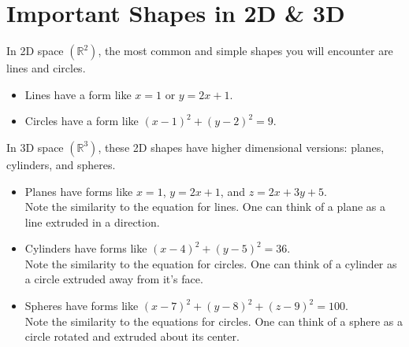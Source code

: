 \section{Important Shapes in 2D \& 3D}
\noindent
In 2D space $\left(\mathbb{R}^2\right)$, the most common and simple shapes you will encounter are lines and circles.
\begin{itemize}
	\item Lines have a form like $x=1$ or $y=2x+1$.
	\item Circles have a form like $\left(x-1\right)^2+\left(y-2\right)^2=9$.
\end{itemize}

\noindent
In 3D space $\left(\mathbb{R}^3\right)$, these 2D shapes have higher dimensional versions: planes, cylinders, and spheres.
\begin{itemize}
	\item{Planes have forms like $x=1$, $y=2x+1$, and $z=2x+3y+5$.\\
		\small{Note the similarity to the equation for lines. One can think of a plane as a line extruded in a direction.}}
	\item{Cylinders have forms like $\left(x-4\right)^2+\left(y-5\right)^2=36$.\\
		\small{Note the similarity to the equation for circles. One can think of a cylinder as a circle extruded away from it's face.}}
	\item{Spheres have forms like $\left(x-7\right)^2+\left(y-8\right)^2+\left(z-9\right)^2=100$.\\
		\small{Note the similarity to the equations for circles. One can think of a sphere as a circle rotated and extruded about its center.}}
\end{itemize}
